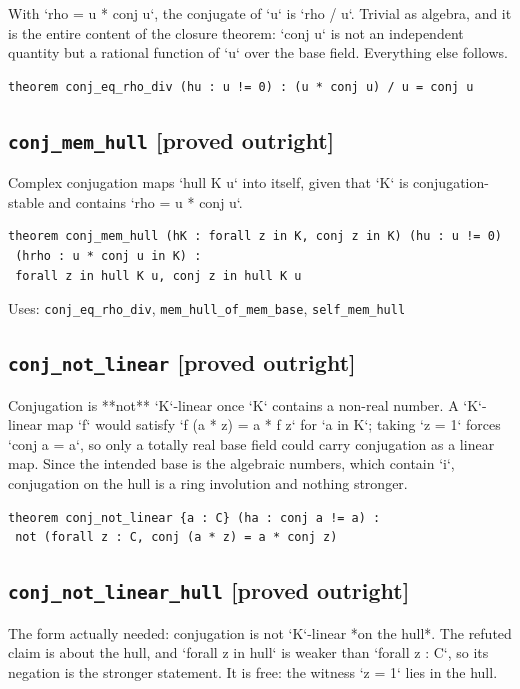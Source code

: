 \documentclass[11pt,a4paper]{article}
\newcommand{\tagpr}{\textcolor{provedc}{\textbf{[proved outright]}}}
\begin{document}
With `rho = u * conj u`, the conjugate of `u` is `rho / u`. Trivial as algebra, and it is the entire content of the closure theorem: `conj u` is not an independent quantity but a rational function of `u` over the base field. Everything else follows.

\begin{lstlisting}
theorem conj_eq_rho_div (hu : u != 0) : (u * conj u) / u = conj u
\end{lstlisting}

\subsection*{\texttt{conj\_mem\_hull} \hfill \tagpr}

Complex conjugation maps `hull K u` into itself, given that `K` is conjugation-stable and contains `rho = u * conj u`.

\begin{lstlisting}
theorem conj_mem_hull (hK : forall z in K, conj z in K) (hu : u != 0)
 (hrho : u * conj u in K) :
 forall z in hull K u, conj z in hull K u
\end{lstlisting}
\noindent\footnotesize Uses: \texttt{conj\_eq\_rho\_div}, \texttt{mem\_hull\_of\_mem\_base}, \texttt{self\_mem\_hull}\normalsize


\subsection*{\texttt{conj\_not\_linear} \hfill \tagpr}

Conjugation is **not** `K`-linear once `K` contains a non-real number. A `K`-linear map `f` would satisfy `f (a * z) = a * f z` for `a in K`; taking `z = 1` forces `conj a = a`, so only a totally real base field could carry conjugation as a linear map. Since the intended base is the algebraic numbers, which contain `i`, conjugation on the hull is a ring involution and nothing stronger.

\begin{lstlisting}
theorem conj_not_linear {a : C} (ha : conj a != a) :
 not (forall z : C, conj (a * z) = a * conj z)
\end{lstlisting}

\subsection*{\texttt{conj\_not\_linear\_hull} \hfill \tagpr}

The form actually needed: conjugation is not `K`-linear *on the hull*. The refuted claim is about the hull, and `forall z in hull` is weaker than `forall z : C`, so its negation is the stronger statement. It is free: the witness `z = 1` lies in the hull.
\end{document}
